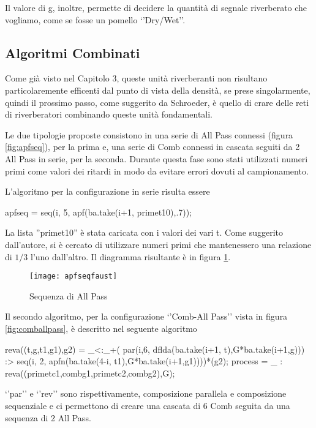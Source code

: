 Il valore di g, inoltre, permette di decidere la quantità di segnale riverberato che vogliamo, come se fosse un pomello `'Dry/Wet''.

\subsection{Algoritmi Combinati}
Come già visto nel Capitolo 3, queste unità riverberanti non risultano particolaremente efficenti dal punto di vista della densità, se prese singolarmente, quindi il prossimo passo, come suggerito da Schroeder, è quello di crare delle reti di riverberatori combinando queste unità fondamentali.

\bigskip

Le due tipologie proposte consistono in una serie di All Pass connessi (figura \ref{fig:apfseq}), per la prima e, una serie di Comb connessi in cascata seguiti da 2 All Pass in serie, per la seconda.
Durante questa fase sono stati utilizzati numeri primi come valori dei ritardi in modo da evitare errori dovuti al campionamento.

L'algoritmo per la configurazione in serie risulta essere

\begin{code}
apfseq =  seq(i, 5, apf(ba.take(i+1, primet10),.7));
\end{code}

La lista ''primet10'' è stata caricata con i valori dei vari t. Come suggerito dall'autore, si è cercato di utilizzare numeri primi che mantenessero una relazione di $1/3$ l'uno dall'altro.
Il diagramma risultante è in figura \ref{fig:apfseqfaust}.

\begin{figure}[htp]
\centering
\texttt{[image: apfseqfaust]}
\caption{Sequenza di All Pass}
\label{fig:apfseqfaust}
\end{figure}

Il secondo algoritmo, per la configurazione `'Comb-All Pass'' vista in figura \ref{fig:comballpass}, è descritto nel seguente algoritmo

\begin{code}
reva((t,g,t1,g1),g2) = _<:_+(
    par(i,6, dflda(ba.take(i+1, t),G*ba.take(i+1,g))) :> 
    seq(i, 2, apfn(ba.take(4-i, t1),G*ba.take(i+1,g1))))*(g2);
process = _ : reva((primetc1,combg1,primetc2,combg2),G);
\end{code}

`'par'' e `'rev'' sono rispettivamente, composizione parallela e composizione sequenziale e ci permettono di creare una cascata di 6 Comb seguita da una sequenza di 2 All Pass. 

